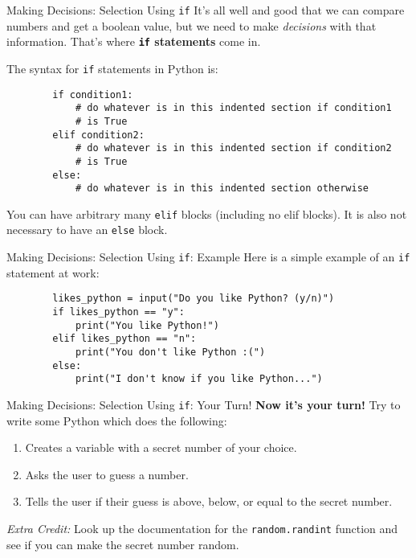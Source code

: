 \documentclass{acm}
\begin{document}
\begin{frame}[fragile]{Making Decisions: Selection Using \texttt{if}}
    It's all well and good that we can compare numbers and get a boolean value,
    but we need to make \textit{decisions} with that information. That's where
    \textbf{\texttt{if} statements} come in.

    \pause
    The syntax for \texttt{if} statements in Python is:
    \begin{verbatim}
        if condition1:
            # do whatever is in this indented section if condition1
            # is True
        elif condition2:
            # do whatever is in this indented section if condition2
            # is True
        else:
            # do whatever is in this indented section otherwise
    \end{verbatim}

    You can have arbitrary many \texttt{elif} blocks (including no elif blocks).
    It is also not necessary to have an \texttt{else} block.
\end{frame}

\begin{frame}[fragile]{Making Decisions: Selection Using \texttt{if}: Example}
    Here is a simple example of an \texttt{if} statement at work:
    \begin{verbatim}
        likes_python = input("Do you like Python? (y/n)")
        if likes_python == "y":
            print("You like Python!")
        elif likes_python == "n":
            print("You don't like Python :(")
        else:
            print("I don't know if you like Python...")
    \end{verbatim}
\end{frame}

\begin{frame}[fragile]{Making Decisions: Selection Using \texttt{if}: Your Turn!}
    \textbf{Now it's your turn!} Try to write some Python which does the
    following:

    \begin{enumerate}
        \item Creates a variable with a secret number of your choice.
        \item Asks the user to guess a number.
        \item Tells the user if their guess is above, below, or equal to the
            secret number.
    \end{enumerate}

    \textit{Extra Credit:} Look up the documentation for the
    \texttt{random.randint} function and see if you can make the secret number
    random.
\end{frame}
\end{document}

